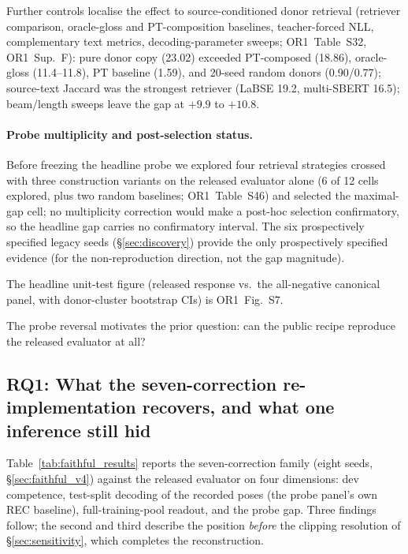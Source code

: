 \documentclass[pdflatex,sn-chicago]{sn-jnl}
\begin{document}
Further controls localise the effect to source-conditioned donor retrieval (retriever comparison, oracle-gloss and PT-composition baselines, teacher-forced NLL, complementary text metrics, decoding-parameter sweeps; OR1~Table~S32, OR1~Sup.~F): pure donor copy (23.02) exceeded PT-composed (18.86), oracle-gloss (11.4--11.8), PT baseline (1.59), and 20-seed random donors (0.90/0.77); source-text Jaccard was the strongest retriever (LaBSE 19.2, multi-SBERT 16.5); beam/length sweeps leave the gap at $+9.9$ to $+10.8$.

\paragraph{Probe multiplicity and post-selection status.}
\label{sec:probe_multiplicity}
Before freezing the headline probe we explored four retrieval strategies crossed with three construction variants on the released evaluator alone (6 of 12 cells explored, plus two random baselines; OR1~Table~S46) and selected the maximal-gap cell; no multiplicity correction would make a post-hoc selection confirmatory, so the headline gap carries no confirmatory interval. The six prospectively specified legacy seeds (\S\ref{sec:discovery}) provide the only prospectively specified evidence (for the non-reproduction direction, not the gap magnitude).

The headline unit-test figure (released response vs.\ the all-negative canonical panel, with donor-cluster bootstrap CIs) is OR1~Fig.~S7.

The probe reversal motivates the prior question: can the public recipe reproduce the released evaluator at all?


\subsection{RQ1: What the seven-correction re-implementation recovers, and what one inference still hid}
\label{sec:positive_evidence}
Table~\ref{tab:faithful_results} reports the seven-correction family (eight seeds, \S\ref{sec:faithful_v4}) against the released evaluator on four dimensions: dev competence, test-split decoding of the recorded poses (the probe panel's own REC baseline), full-training-pool readout, and the probe gap. Three findings follow; the second and third describe the position \emph{before} the clipping resolution of \S\ref{sec:sensitivity}, which completes the reconstruction.
\end{document}
